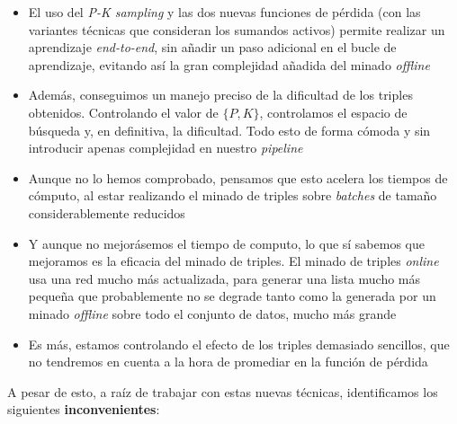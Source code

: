 \begin{itemize}
    \item El uso del \textit{P-K sampling} y las dos nuevas funciones de pérdida (con las variantes técnicas que consideran los sumandos activos) permite realizar un aprendizaje \textit{end-to-end}, sin añadir un paso adicional en el bucle de aprendizaje, evitando así la gran complejidad añadida del minado \textit{offline}
    \item Además, conseguimos un manejo preciso de la dificultad de los triples obtenidos. Controlando el valor de $\{P, K\}$, controlamos el espacio de búsqueda y, en definitiva, la dificultad. Todo esto de forma cómoda y sin introducir apenas complejidad en nuestro \textit{pipeline}
    \item Aunque no lo hemos comprobado, pensamos que esto acelera los tiempos de cómputo, al estar realizando el minado de triples sobre \textit{batches} de tamaño considerablemente reducidos
    \item Y aunque no mejorásemos el tiempo de computo, lo que sí sabemos que mejoramos es la eficacia del minado de triples. El minado de triples \textit{online} usa una red mucho más actualizada, para generar una lista mucho más pequeña que probablemente no se degrade tanto como la generada por un minado \textit{offline} sobre todo el conjunto de datos, mucho más grande
    \item Es más, estamos controlando el efecto de los triples demasiado sencillos, que no tendremos en cuenta a la hora de promediar en la función de pérdida
\end{itemize}

A pesar de esto, a raíz de trabajar con estas nuevas técnicas, identificamos los siguientes \textbf{inconvenientes}:

